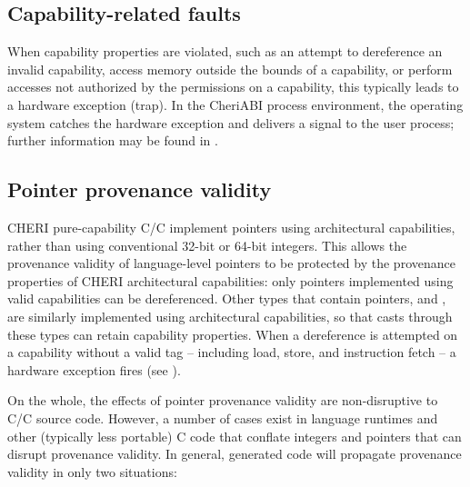 \documentclass[12pt,twoside,openright,a4paper]{article}
\newcommand{\ccode}[1]{{\small\ttfamily{#1}}}
\newcommand{\cuintptrt}{{\ccode{uintptr\_t}}\xspace}
\newcommand{\cintptrt}{{\ccode{intptr\_t}}\xspace}
\newcommand{\SIGPROT}{{\ccode{SIGPROT}}\xspace}
\newcommand{\note}[2]{{\color{blue}[ Note: #1 - #2]}}
\renewcommand{\note}[2]{\relax\ifhmode\unskip\fi}
\newcommand{\arnote}[1]{\note{#1}{Alex R.}}
\newcommand{\rwnote}[1]{\note{#1}{Robert W.}}
\newcommand{\psnote}[1]{\note{#1}{Peter S.}}
\newcommand*{\cpp}[1][]{C\textsmaller[2]{\nolinebreak[4]\hspace{-.05em}\raisebox{.45ex}{\textbf{++}}}}
\newcommand*{\purecapCOrCpp}[1]{CHERI pure-capability C/\cpp{}}
\begin{document}
\subsection{Capability-related faults}
\label{sec:faults}

When capability properties are violated, such as an attempt to dereference an
invalid capability, access memory outside the bounds of a capability, or perform
accesses not authorized by the permissions on a capability, this typically
leads to a hardware exception (trap).
In the CheriABI process environment, the operating system catches the hardware
exception and delivers a \SIGPROT signal to the user process;
further information may be found in .

\rwnote{We've opted to use the term ``hardware exception'' throughout, and
  mention ``traps'' only here.  This could cause confusion with respect to \cpp{}
  exceptions .. but perhaps less so than if we used the word ``exception''
  unadorned.}

\subsection{Pointer provenance validity}
\label{sec:pointer_provenance_validity}

\purecapCOrCpp{} implement pointers using architectural
capabilities, rather than using conventional 32-bit or 64-bit integers.
This allows the provenance validity of language-level pointers to be
protected by the provenance properties of CHERI architectural capabilities:
only pointers implemented using valid capabilities can be dereferenced.
Other types that contain pointers, \cuintptrt and \cintptrt,
are similarly implemented
using architectural capabilities, so that casts through these types
can retain capability properties.
When a dereference is attempted on a capability without a valid tag --
including load, store, and instruction fetch -- a hardware exception fires
(see ).

On the whole, the effects of pointer provenance validity are non-disruptive to
C/\cpp{} source code.
However, a number of cases exist in language runtimes and other
(typically less portable) C code that conflate integers and pointers that can
disrupt provenance validity.
In general, generated code will propagate provenance validity in only two
situations:
\end{document}
